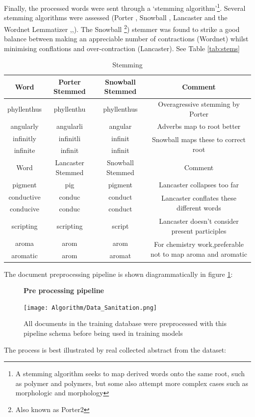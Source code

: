 Finally, the processed words were sent through a `stemming algorithm'\footnote{A stemming algorithm seeks to map derived words onto the same root, such as polymer and polymers, but some also attempt more complex cases such as morphologic and morphology}. Several stemming algorithms were assessed (Porter \cite{porter}, Snowball \cite{snowball}\cite{nltk}, Lancaster \cite{lancaster} and the Wordnet Lemmatizer \cite{wordnet1},\cite{wordnet2},\cite{wordnet3}). The Snowball \footnote{Also known as Porter2}) stemmer was found to strike a good balance between making an appreciable number of contractions (Wordnet) whilst minimising conflations and over-contraction (Lancaster). See Table \ref{tab:stems}
\begin{table}[h!]
\begin{center}
\caption{Stemming}
\begin{tabular}{||c|c|c|c||}
\hline
Word & Porter Stemmed & Snowball Stemmed & Comment\\
\hline     
phyllenthus & phyllenthu & phyllenthus & Overagressive stemming by Porter\\
\hline
angularly & angularli & angular & Adverbs map to root better\\
\hline
infinitly & infinitli & infinit & \multirow{2}{*}{Snowball maps these to correct root}\\
\cline{1-3}
infinite & infinit & infinit&\\
\hline
\hline
Word & Lancaster Stemmed & Snowball Stemmed & Comment\\
\hline
pigment & pig & pigment & Lancaster collapses too far\\
\hline
conductive & conduc & conduct & \multirow{2}{*}{Lancaster conflates these different words}\\
\cline{1-3}
conducive & conduc & conduct & \\
\hline
scripting & scripting & script & Lancaster doesn't consider present participles\\
\hline
aroma & arom & arom & \multirow{2}{*}{For chemistry work,preferable not to map aroma and aromatic}\\
\cline{1-3}
aromatic & arom & aromat & \\
\hline
\end{tabular}
\end{center}
\end{table}
The document preprocessing pipeline is shown diagrammatically in figure \ref{fig:SANPIPE}:

\begin{figure}[H]
    \centering
    \textbf{Pre processing pipeline}\par\medskip
    \texttt{[image: Algorithm/Data\_Sanitation.png]}
    \caption{All documents in the training database were preprocessed with this pipeline schema before being used in training models}
     \label{fig:SANPIPE}
\end{figure}
The process is best illustrated by real collected abstract from the dataset:

